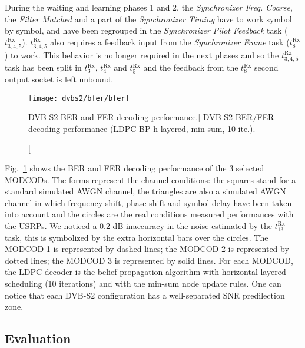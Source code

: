 During the waiting and learning phases 1 and 2, the \emph{Synchronizer Freq.
Coarse}, the \emph{Filter Matched} and a part of the \emph{Synchronizer Timing}
have to work symbol by symbol, and have been regrouped in the \emph{Synchronizer
Pilot Feedback} task ($t^\text{Rx}_{3,4,5}$). $t^\text{Rx}_{3,4,5}$ also
requires a feedback input from the \emph{Synchronizer Frame} task
($t^\text{Rx}_8$) to work. This behavior is no longer required in the next
phases and so the $t^\text{Rx}_{3,4,5}$ task has been split in $t^\text{Rx}_3$,
$t^\text{Rx}_4$ and $t^\text{Rx}_5$ and the feedback from the $t^\text{Rx}_8$
second output socket is left unbound.

\begin{figure}[htp]
  \centering
  \texttt{[image: dvbs2/bfer/bfer]}
  \caption
    [DVB-S2 BER and FER decoding performance.]
    {DVB-S2 BER/FER decoding performance (LDPC BP h-layered, min-sum, 10 ite.).}
  \label{fig:dvbs2_bfer}
\end{figure}

Fig.~\ref{fig:dvbs2_bfer} shows the BER and FER decoding performance of the
3 selected MODCODs. The forms represent the channel conditions: the squares
stand for a standard simulated AWGN channel, the triangles are also a simulated
AWGN channel in which frequency shift, phase shift and symbol delay have been
taken into account and the circles are the real conditions measured performances
with the USRPs. We noticed a 0.2 dB inaccuracy in the noise estimated by the
$t^\text{Rx}_{13}$ task, this is symbolized by the extra horizontal bars over
the circles. The {\color{Paired-1} MODCOD 1} is represented by dashed lines; the
{\color{Paired-3} MODCOD 2} is represented by dotted lines; the
{\color{Paired-5} MODCOD 3} is represented by solid lines. For each MODCOD, the
LDPC decoder is the belief propagation algorithm with horizontal layered
scheduling (10 iterations) and with the min-sum node update rules. One can
notice that each DVB-S2 configuration has a well-separated SNR predilection
zone.

\subsection{Evaluation}

